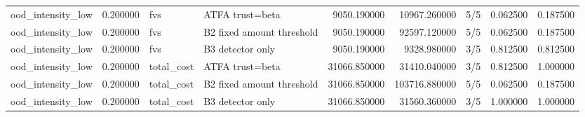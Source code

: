 \begin{tabular}{lrllrrlrr}
ood\_intensity\_low & 0.200000 & fvs & ATFA trust=beta & 9050.190000 & 10967.260000 & 5/5 & 0.062500 & 0.187500 \\
ood\_intensity\_low & 0.200000 & fvs & B2 fixed amount threshold & 9050.190000 & 92597.120000 & 5/5 & 0.062500 & 0.187500 \\
ood\_intensity\_low & 0.200000 & fvs & B3 detector only & 9050.190000 & 9328.980000 & 3/5 & 0.812500 & 0.812500 \\
ood\_intensity\_low & 0.200000 & total\_cost & ATFA trust=beta & 31066.850000 & 31410.040000 & 3/5 & 0.812500 & 1.000000 \\
ood\_intensity\_low & 0.200000 & total\_cost & B2 fixed amount threshold & 31066.850000 & 103716.880000 & 5/5 & 0.062500 & 0.187500 \\
ood\_intensity\_low & 0.200000 & total\_cost & B3 detector only & 31066.850000 & 31560.360000 & 3/5 & 1.000000 & 1.000000 \\
\bottomrule
\end{tabular}
